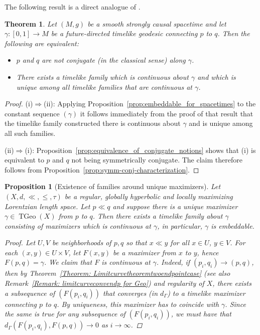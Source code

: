 \documentclass[a4paper,11pt]{article}
\numberwithin{equation}{section}
\theoremstyle{plain}
\newtheorem{Theorem}[Definition]{Theorem}
\newtheorem{Proposition}[Definition]{Proposition}
\theoremstyle{definition}
\DeclareMathOperator{\TGeo}{TGeo}
\begin{document}
The following result is a direct analogue of \cite[Prop.\ 3.5]{shankar2009conjugate}.
\begin{Theorem}\label{thm:classical-conj-vs-unique-family}
Let $(M,g)$ be a smooth strongly causal spacetime and let $\gamma \colon [0, 1] \to M$ be a future-directed timelike geodesic connecting $p$ to $q$. Then the following are equivalent:
\begin{itemize}
\item[(i)] $p$ and $q$ are not conjugate (in the classical sense) along $\gamma$.
\item[(ii)] There exists a timelike family which is continuous about $\gamma$ and which is
unique among all timelike families that are continuous at $\gamma$.
\end{itemize}
\end{Theorem} 
\begin{proof}
(i)$\Rightarrow$(ii): Applying Proposition~\ref{prop:embeddable_for_spacetimes} to the constant sequence $(\gamma)$
it follows immediately from the proof of that result that the timelike
family constructed there is continuous about $\gamma$ and is unique among all such families.

(ii)$\Rightarrow$(i): Proposition~\ref{prop:equivalence_of_conjugate_notions} shows that (i) is equivalent to $p$ and $q$ not
being symmetrically conjugate. The claim therefore follows from Proposition~\ref{prop:symm-conj-characterization}.
\end{proof}

\begin{Proposition}[Existence of families around unique maximizers]
\label{Proposition: Existenceoffamiliesifgeodunique}
Let $(X,d,\ll,\leq,\tau)$ be a regular, globally hyperbolic and locally maximizing Lorentzian length space. Let $p \ll q$ and suppose there is a unique maximizer $\gamma \in \TGeo(X)$ from $p$ to $q$. Then there exists a timelike family about $\gamma$ consisting of maximizers which is continuous at $\gamma$, in particular, $\gamma$ is embeddable.
\begin{proof}
    Let $U, V$ be neighborhoods of $p,q$ so that $x \ll y$ for all $x \in U$, $y \in V$. For each $(x,y) \in U \times V$, let $F(x,y)$ be a maximizer from $x$ to $y$, hence $F(p,q)=\gamma$. We claim that $F$ is continuous at $\gamma$. Indeed, if $(p_i,q_i)\to (p,q)$, then by Theorem~\ref{Theorem: Limitcurvetheoremtwoendpointcase} (see also Remark~\ref{Remark: limitcurveconvendp for Geo}) and regularity of $X$, 
    there exists a subsequence of $(F(p_i,q_i))$ that converges (in $d_{\Gamma}$) to a timelike maximizer connecting $p$ to $q$. By uniqueness, this maximizer has to coincide with $\gamma$. Since the same is true for any subsequence of $(F(p_i,q_i))$, we must have that $d_\Gamma(F(p_i,q_i),F(p,q))\to 0$ as $i\to \infty$.  
\end{proof}
\end{Proposition}
\end{document}
